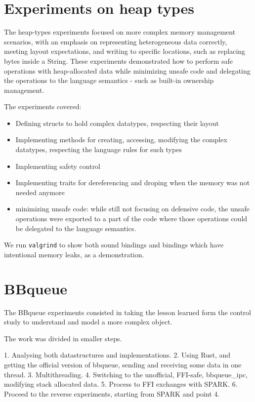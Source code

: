 \documentclass[nomenclature, english, bibtex]{kththesis}
\begin{document}
\section{Experiments on heap types}
The heap-types experiments focused on more complex memory management scenarios, with an emphasis on representing heterogeneous data correctly, meeting layout expectations, and writing to specific locations, such as replacing bytes inside a String. These experiments demonstrated how to perform safe operations with heap-allocated data while minimizing unsafe code and delegating the operations to the language semantics - such as built-in ownership management.

The experiments covered:

\begin{itemize}
    \item Defining structs to hold complex datatypes, respecting their layout
    \item Implementing methods for creating, accessing, modifying the complex datatypes, respecting the language rules for such types
    \item Implementing safety control
    \item Implementing traits for dereferencing and droping when the memory was not needed anymore
    \item minimizing unsafe code: while still not focusing on defensive code, the unsafe operations were exported to a part of the code where those operations could be delegated to the language semantics.   
\end{itemize}


We run \texttt{valgrind} to show both sound bindings and bindings which have intentional memory leaks, as a demonstration.

\section{BBqueue}

The BBqueue experiments consisted in taking the lesson learned form the control study to understand and model a more complex object.


The work was divided in smaller steps.

1. Analysing both datastructures and implementations.
2. Using Rust, and getting the official version of bbqueue, sending and receiving some data in one thread.
3. Multithreading.
4. Switching to the unofficial, FFI-safe, bbqueue\_ipc, modifying stack allocated data. 
5. Process to FFI exchanges with SPARK.
6. Proceed to the reverse experiments, starting from SPARK and point 4.
\end{document}
